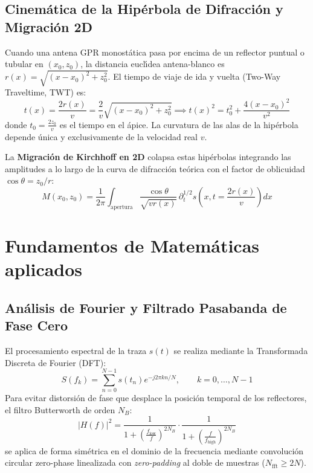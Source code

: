 \documentclass[11pt,a4paper]{article}
\begin{document}
\subsection{Cinem{\'a}tica de la Hip{\'e}rbola de Difracci{\'o}n y Migraci{\'o}n 2D}
Cuando una antena GPR monost{\'a}tica pasa por encima de un reflector puntual o tubular en $(x_0, z_0)$, la distancia eucl{\'\i}dea antena-blanco es $r(x) = \sqrt{(x - x_0)^2 + z_0^2}$. El tiempo de viaje de ida y vuelta (Two-Way Traveltime, TWT) es:
\begin{equation}
    t(x) = \frac{2 r(x)}{v} = \frac{2}{v} \sqrt{(x - x_0)^2 + z_0^2} \implies t(x)^2 = t_0^2 + \frac{4(x - x_0)^2}{v^2}
\end{equation}
donde $t_0 = \frac{2 z_0}{v}$ es el tiempo en el {\'a}pice. La curvatura de las alas de la hip{\'e}rbola depende {\'u}nica y exclusivamente de la velocidad real $v$.

La \textbf{Migraci{\'o}n de Kirchhoff en 2D} colapsa estas hip{\'e}rbolas integrando las amplitudes a lo largo de la curva de difracci{\'o}n te{\'o}rica con el factor de oblicuidad $\cos\theta = z_0 / r$:
\begin{equation}
    M(x_0, z_0) = \frac{1}{2\pi} \int_{\text{apertura}} \frac{\cos\theta}{\sqrt{v r(x)}} \, \partial_t^{1/2} s\left(x, t = \frac{2 r(x)}{v}\right) dx
\end{equation}

\section{Fundamentos de Matem{\'a}ticas aplicados}

\subsection{An{\'a}lisis de Fourier y Filtrado Pasabanda de Fase Cero}
El procesamiento espectral de la traza $s(t)$ se realiza mediante la Transformada Discreta de Fourier (DFT):
\begin{equation}
    S(f_k) = \sum_{n=0}^{N-1} s(t_n) e^{-j 2\pi k n / N}, \qquad k = 0, \dots, N-1
\end{equation}
Para evitar distorsi{\'o}n de fase que desplace la posici{\'o}n temporal de los reflectores, el filtro Butterworth de orden $N_B$:
\begin{equation}
    |H(f)|^2 = \frac{1}{1 + \left(\frac{f_{\text{low}}}{f}\right)^{2 N_B}} \cdot \frac{1}{1 + \left(\frac{f}{f_{\text{high}}}\right)^{2 N_B}}
\end{equation}
se aplica de forma sim{\'e}trica en el dominio de la frecuencia mediante convoluci{\'o}n circular zero-phase linealizada con \textit{zero-padding} al doble de muestras ($N_{\text{fft}} \ge 2 N$).
\end{document}

